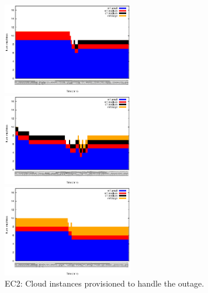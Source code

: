 \begin{figure}[htb]
\vspace{-5mm}
	\begin{minipage}[b]{0.32\linewidth}
		\vspace{-3mm}
		\includegraphics[height=4cm]{images/exps2011/low/ec2/inst_type_machines_filtered.eps}	
	\end{minipage}
	\hfill
	\begin{minipage}[b]{0.32\linewidth}
		\vspace{-3mm}
		\includegraphics[height=4cm]{images/exps2011/medium/ec2/inst_type_machines_filtered.eps}
	\end{minipage}
\hfill
\begin{minipage}[b]{0.32\linewidth}
		\vspace{-3mm}
		\includegraphics[height=4cm]{images/exps2011/high/ec2/inst_type_machines_filtered.eps}
	\end{minipage}
\vspace{-3mm}
\caption{EC2: Cloud instances provisioned to handle the outage.}
\label{fig:EC2Instances}
\end{figure}


